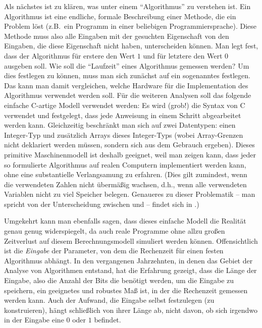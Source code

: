 Als nächstes ist zu klären, was unter einem "`Algorithmus"' zu
verstehen ist. Ein Algorithmus ist eine endliche, formale Beschreibung
einer Methode, die ein Problem löst (z.B.~ein Programm in einer
beliebigen Programmiersprache). Diese Methode muss also alle Eingaben
mit der gesuchten Eigenschaft von den Eingaben, die diese Eigenschaft
nicht haben, unterscheiden können. Man legt fest, dass der Algorithmus
für erstere den Wert $1$ und für letztere den Wert $0$ ausgeben
soll. Wie soll die "`Laufzeit"' eines Algorithmus gemessen werden? Um
dies festlegen zu können, muss man sich zunächst auf ein sogenanntes
 festlegen. Das kann man damit vergleichen,
welche Hardware für die Implementation des Algorithmus verwendet
werden soll. Für die weiteren Analysen soll das folgende einfache
C-artige Modell verwendet werden: Es wird (grob!) die Syntax von C
verwendet und festgelegt, dass jede Anweisung in einem Schritt
abgearbeitet werden kann. Gleichzeitig beschränkt man sich auf zwei
Datentypen: einen Integer-Typ und zusätzlich Arrays dieses
Integer-Typs (wobei Array-Grenzen nicht deklariert werden müssen,
sondern sich aus dem Gebrauch ergeben). Dieses primitive
Maschinenmodell ist deshalb geeignet, weil man zeigen kann, dass jeder
so formulierte Algorithmus auf realen Computern implementiert werden
kann, ohne eine substantielle Verlangsamung zu erfahren.  
%
(Dies gilt zumindest, wenn die verwendeten Zahlen nicht
übermäßig wachsen, d.h., wenn alle verwendeten Variablen nicht zu viel
Speicher belegen. Genaueres zu dieser Problematik -- man spricht von
der Unterscheidung zwischen  und
 -- findet sich in \cite[S.~62f]{Sch01}.)

Umgekehrt kann man ebenfalls sagen, dass dieses einfache Modell die
Realität genau genug widerspiegelt, da auch reale Programme ohne allzu
großen Zeitverlust auf diesem Berechnungsmodell simuliert werden
können. Offensichtlich ist die \emph{Eingabe} der Parameter, von dem
die Rechenzeit für einen festen Algorithmus abhängt. In den
vergangenen Jahrzehnten, in denen das Gebiet der Analyse von
Algorithmen entstand, hat die Erfahrung gezeigt, dass die Länge der
Eingabe, also die Anzahl der Bits die benötigt werden, um die Eingabe
zu speichern, ein geeignetes und robustes Maß ist, in der die
Rechenzeit gemessen werden kann. Auch der Aufwand, die Eingabe selbst
festzulegen (zu konstruieren), hängt schließlich von ihrer Länge ab,
nicht davon, ob sich irgendwo in der Eingabe eine $0$ oder $1$
befindet.


